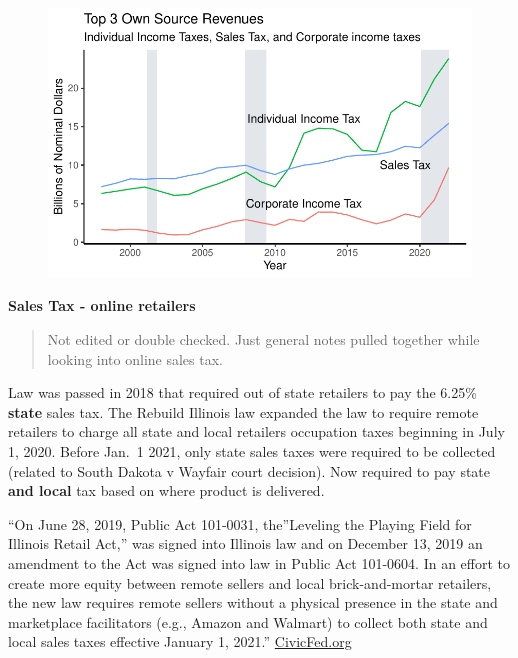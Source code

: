 \documentclass[
  letterpaper,
  DIV=11,
  numbers=noendperiod]{scrreport}
\begin{document}
\begin{figure}[H]

{\centering \includegraphics{./Everything_files/figure-pdf/unnamed-chunk-12-1.pdf}

}

\end{figure}

\textbf{Sales Tax - online retailers}

\begin{quote}
Not edited or double checked. Just general notes pulled together while
looking into online sales tax.
\end{quote}

Law was passed in 2018 that required out of state retailers to pay the
6.25\% \textbf{state} sales tax. The Rebuild Illinois law expanded the
law to require remote retailers to charge all state and local retailers
occupation taxes beginning in July 1, 2020. Before Jan.~1 2021, only
state sales taxes were required to be collected (related to South Dakota
v Wayfair court decision). Now required to pay state \textbf{and local}
tax based on where product is delivered.

``On June 28, 2019, Public Act 101-0031, the''Leveling the Playing Field
for Illinois Retail Act,'' was signed into Illinois law and on December
13, 2019 an amendment to the Act was signed into law in Public Act
101-0604. In an effort to create more equity between remote sellers and
local brick-and-mortar retailers, the new law requires remote sellers
without a physical presence in the state and marketplace facilitators
(e.g., Amazon and Walmart) to collect both state and local sales taxes
effective January 1, 2021.''
\href{https://www.civicfed.org/civic-federation/blog/consumer-taxes-chicago-increases-and-updates-2021}{CivicFed.org}
\end{document}
